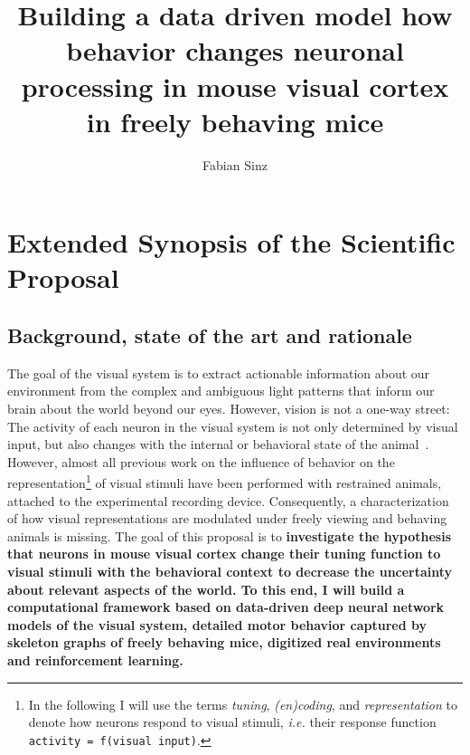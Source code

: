 \documentclass[COG,11pt]{ercgrant}
\author{Fabian Sinz}
\title{Building a data driven model how behavior changes neuronal processing in mouse visual cortex in freely behaving mice}
\begin{document}
\maketitle

\begin{abstract}
	\textcolor{red}{
		
	}
\end{abstract}



\section{Extended Synopsis of the Scientific Proposal}

\subsection{Background, state of the art and rationale}
The goal of the visual system is to extract actionable information about our environment from the complex and ambiguous light patterns that inform our brain about the world beyond our eyes.
However, vision is not a one-way street: The activity of each neuron in the visual system is not only determined by visual input, but also changes with the internal or behavioral state of the animal~\parencite{Niell2010-bs, Musall2019-kd, Erisken2014-un, Franke2022-do}. 
However, almost all previous work on the influence of behavior on the representation\footnote{In the following I will use the terms \textit{tuning}, \textit{(en)coding}, and \textit{representation} to denote how neurons respond to visual stimuli, \textit{i.e.} their response function \texttt{activity = f(visual input)}.} of visual stimuli have been performed with restrained animals, attached to the experimental recording device.
Consequently, a characterization of how visual representations are modulated under freely viewing and behaving animals is missing. 
The goal of this proposal is to \textbf{investigate the hypothesis that neurons in mouse visual cortex change their tuning function to visual stimuli with the behavioral context to decrease the uncertainty about relevant aspects of the world. To this end, I will build a computational framework based on data-driven deep neural network models of the visual system, detailed motor behavior captured by skeleton graphs of freely behaving mice, digitized real environments and reinforcement learning.} 
\end{document}
